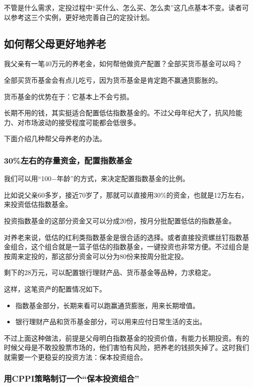不管是什么需求，定投过程中“买什么、怎么买、怎么卖”这几点基本不变。读者可以参考这三个实例，更好地完善自己的定投计划。

\subsection{如何帮父母更好地养老}
{\kaishu 我父亲有一笔40万元的养老金，如何帮他做资产配置？全部买货币基金可以吗？}

全部买货币基金会有点儿吃亏，因为货币基金是肯定跑不赢通货膨胀的。

货币基金的优势在于：它基本上不会亏损。

长期不用的钱，其实挺适合配置低估指数基金的。不过父母年纪大了，抗风险能力、对市场波动的接受程度可能都会低很多。

下面介绍几种帮父母养老的办法。

\subsubsection{30\%左右的存量资金，配置指数基金}

我们可以用“100$-$年龄”的方式，来决定配置指数基金的比例。

比如说父亲60多岁，接近70岁了，那就可以直接用30\%的资金，也就是12万左右，来投资低估指数基金。

投资指数基金的这部分资金又可以分成20份，按月分批配置低估的指数基金。

对养老来说，低估的红利类指数基金是很合适的选择。或者直接投资螺丝钉指数基金组合，这个组合就是一篮子低估的指数基金，一键投资也非常方便。不过组合是按周来定投的，那这部分资金可以分为80份来按周分批定投。

剩下的28万元，可以配置银行理财产品、货币基金等品种，力求稳定。

这样，这笔资产的配置情况如下。

\begin{itemize}
\item 指数基金部分，长期来看可以跑赢通货膨胀，用来长期增值。
\item 银行理财产品和货币基金部分，可以用来应付日常生活的支出。
\end{itemize}

不过上面这种做法，前提是父母明白指数基金的投资价值，有能力长期投资。有的时候父母是不敢投股票市场的，他们害怕有风险，把养老的钱损失掉了。这时我们就需要一个更稳妥的投资方法：保本投资组合。

\subsubsection{用CPPI策略制订一个“保本投资组合”}

